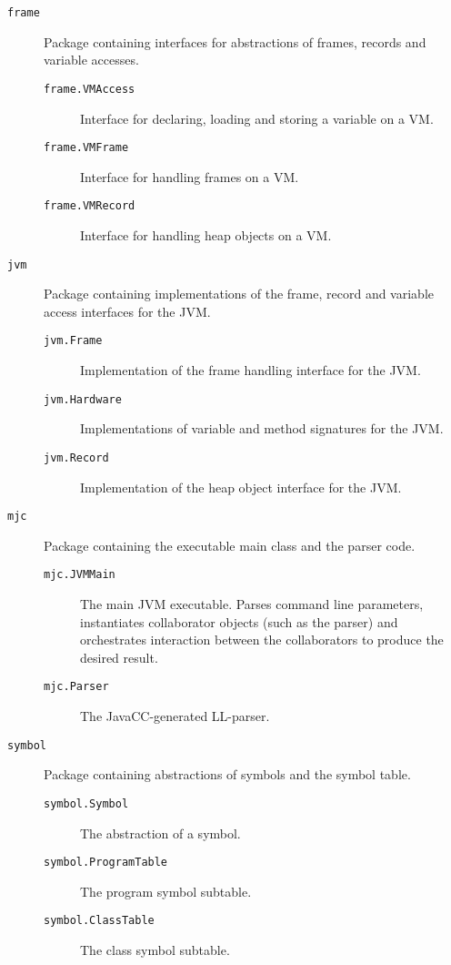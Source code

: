 \documentclass[a4paper]{article}
\begin{document}
\begin{description}
\item[\texttt{frame}] Package containing interfaces for abstractions of frames,
    records and variable accesses.
    \begin{description}
        \item[\texttt{frame.VMAccess}] Interface for declaring, loading and
            storing a variable on a VM.
        \item[\texttt{frame.VMFrame}] Interface for handling frames on a VM.
        \item[\texttt{frame.VMRecord}] Interface for handling heap objects on a
            VM.
    \end{description}
\item[\texttt{jvm}] Package containing implementations of the frame, record and
    variable access interfaces for the JVM.
    \begin{description}
        \item[\texttt{jvm.Frame}] Implementation of the frame handling interface
            for the JVM.
        \item[\texttt{jvm.Hardware}] Implementations of variable and method
            signatures for the JVM.
        \item[\texttt{jvm.Record}] Implementation of the heap object interface
            for the JVM.
    \end{description}
\item[\texttt{mjc}] Package containing the executable main class and the parser
    code.
    \begin{description}
        \item[\texttt{mjc.JVMMain}] The main JVM executable. Parses command line
            parameters, instantiates collaborator objects (such as the parser)
            and orchestrates interaction between the collaborators to produce
            the desired result.
        \item[\texttt{mjc.Parser}] The JavaCC-generated LL-parser.
    \end{description}
\item[\texttt{symbol}] Package containing abstractions of symbols and the symbol
    table.
    \begin{description}
        \item[\texttt{symbol.Symbol}] The abstraction of a symbol.
        \item[\texttt{symbol.ProgramTable}] The program symbol subtable.
        \item[\texttt{symbol.ClassTable}] The class symbol subtable.

\end{description}
\end{description}
\end{document}
